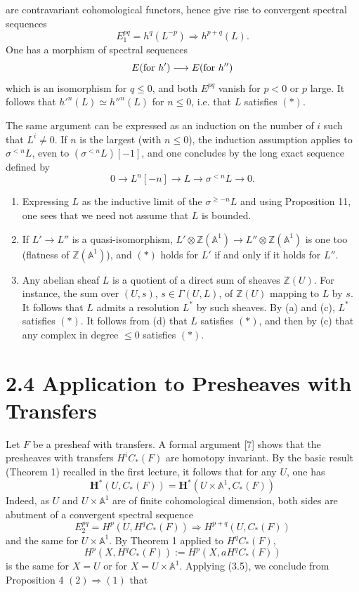 \documentclass[11pt]{article}
\newcommand{\Aone}{\mathbb A^1}
\newcommand{\Z}{\mathbb Z}
\theoremstyle{deligne}
\begin{document}
are contravariant cohomological functors, hence give rise to convergent spectral sequences
\[
E_1^{pq}=h^q(L^{-p})\Rightarrow h^{p+q}(L).
\]
One has a morphism of spectral sequences
\[
E(\hbox{for }h')\longrightarrow E(\hbox{for }h'')
\]
which is an isomorphism for \(q\le0\), and both \(E^{pq}\) vanish for \(p<0\) or \(p\) large. It follows that \(h'^n(L)\simeq h''^n(L)\) for \(n\le0\), i.e. that \(L\) satisfies \((*)\).

The same argument can be expressed as an induction on the number of \(i\) such that \(L^i\ne0\). If \(n\) is the largest (with \(n\le0\)), the induction assumption applies to \(\sigma^{<n}L\), even to \((\sigma^{<n}L)[-1]\), and one concludes by the long exact sequence defined by
\[
0\longrightarrow L^n[-n]\longrightarrow L\longrightarrow\sigma^{<n}L\longrightarrow0.
\]

\begin{enumerate}[label=(\alph*),start=3]
\item Expressing \(L\) as the inductive limit of the \(\sigma^{\ge-n}L\) and using Proposition 11, one sees that we need not assume that \(L\) is bounded.
\item If \(L'\to L''\) is a quasi-isomorphism, \(L'\otimes\Z(\Aone)\to L''\otimes\Z(\Aone)\) is one too (flatness of \(\Z(\Aone)\)), and \((*)\) holds for \(L'\) if and only if it holds for \(L''\).
\item Any abelian sheaf \(L\) is a quotient of a direct sum of sheaves \(\Z(U)\). For instance, the sum over \((U,s)\), \(s\in\Gamma(U,L)\), of \(\Z(U)\) mapping to \(L\) by \(s\). It follows that \(L\) admits a resolution \(L^*\) by such sheaves. By (a) and (c), \(L^*\) satisfies \((*)\). It follows from (d) that \(L\) satisfies \((*)\), and then by (c) that any complex in degree \(\le0\) satisfies \((*)\).
\end{enumerate}

\section*{2.4 Application to Presheaves with Transfers}

Let \(F\) be a presheaf with transfers. A formal argument [7] shows that the presheaves with transfers \(H^i C_*(F)\) are homotopy invariant. By the basic result (Theorem 1) recalled in the first lecture, it follows that for any \(U\), one has
\[
\mathbf H^*(U,C_*(F))=\mathbf H^*(U\times\Aone,C_*(F)) \tag{4.1}
\]
Indeed, as \(U\) and \(U\times\Aone\) are of finite cohomological dimension, both sides are abutment of a convergent spectral sequence
\[
E_2^{pq}=H^p(U,H^qC_*(F))\Rightarrow H^{p+q}(U,C_*(F))
\]
and the same for \(U\times\Aone\). By Theorem 1 applied to \(H^qC_*(F)\),
\[
H^p(X,H^qC_*(F)):=H^p(X,aH^qC_*(F))
\]
is the same for \(X=U\) or for \(X=U\times\Aone\). Applying (3.5), we conclude from Proposition 4 \((2)\Rightarrow(1)\) that
\end{document}
